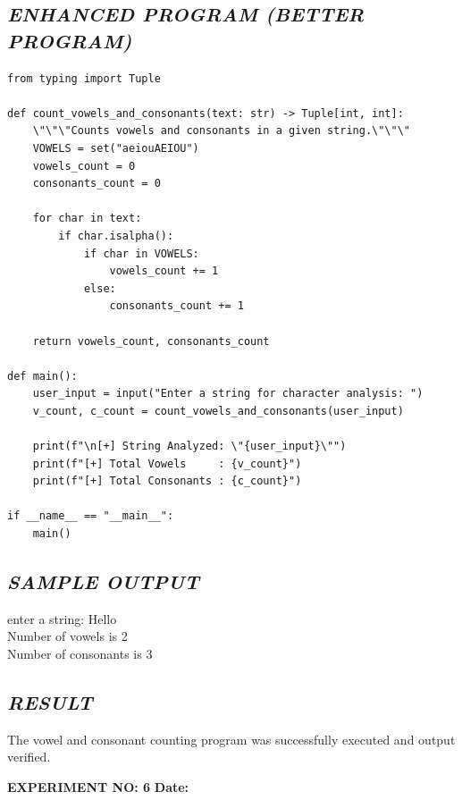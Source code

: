 \documentclass[11pt,a4paper]{article}
\begin{document}
\subsection*{\textit{ENHANCED PROGRAM (BETTER PROGRAM)}}
\begin{lstlisting}[style=pythonstyle]
from typing import Tuple

def count_vowels_and_consonants(text: str) -> Tuple[int, int]:
    \"\"\"Counts vowels and consonants in a given string.\"\"\"
    VOWELS = set("aeiouAEIOU")
    vowels_count = 0
    consonants_count = 0
    
    for char in text:
        if char.isalpha():
            if char in VOWELS:
                vowels_count += 1
            else:
                consonants_count += 1
                
    return vowels_count, consonants_count

def main():
    user_input = input("Enter a string for character analysis: ")
    v_count, c_count = count_vowels_and_consonants(user_input)
    
    print(f"\n[+] String Analyzed: \"{user_input}\"")
    print(f"[+] Total Vowels     : {v_count}")
    print(f"[+] Total Consonants : {c_count}")

if __name__ == "__main__":
    main()
\end{lstlisting}

\subsection*{\textit{SAMPLE OUTPUT}}
\begin{tcolorbox}[colback=black!85,colframe=navyblue,title=\textbf{Terminal Output},coltitle=white,fonttitle=\bfseries\small]
\small\ttfamily\color{green!30!white}
enter a string: Hello\\
Number of vowels is  2\\
Number of consonants is  3
\end{tcolorbox}

\subsection*{\textit{RESULT}}
The vowel and consonant counting program was successfully executed and output verified.

\newpage

\noindent
\textbf{\large EXPERIMENT NO: 6} \hfill \textbf{\large Date: \underline{\hspace{3cm}}}
\end{document}
